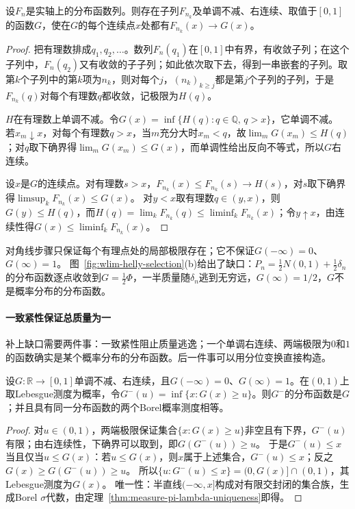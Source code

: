 \begin{lemma}
\label{lem:wlim-helly}
设$F_n$是实轴上的分布函数列。则存在子列$F_{n_k}$及单调不减、右连续、取值于$[0,1]$的函数$G$，使在$G$的每个连续点$x$处都有$F_{n_k}(x)\to G(x)$。
\end{lemma}

\begin{proof}
把有理数排成$q_1,q_2,\ldots$。数列$F_n(q_1)$在$[0,1]$中有界，有收敛子列；在这个子列中，$F_n(q_2)$又有收敛的子子列；如此依次取下去，得到一串嵌套的子列。取第$k$个子列中的第$k$项为$n_k$，则对每个$j$，$(n_k)_{k\geq j}$都是第$j$个子列的子列，于是$F_{n_k}(q)$对每个有理数$q$都收敛，记极限为$H(q)$。

$H$在有理数上单调不减。令$G(x)=\inf\{H(q):q\in\mathbb Q,\,q>x\}$，它单调不减。
若$x_m\downarrow x$，对每个有理数$q>x$，当$m$充分大时$x_m<q$，故$\lim_mG(x_m)\leq H(q)$；对$q$取下确界得$\lim_mG(x_m)\leq G(x)$，而单调性给出反向不等式，所以$G$右连续。

设$x$是$G$的连续点。对有理数$s>x$，$F_{n_k}(x)\leq F_{n_k}(s)\to H(s)$，对$s$取下确界得$\limsup_kF_{n_k}(x)\leq G(x)$。
对$y<x$取有理数$q\in(y,x)$，则$G(y)\leq H(q)$，而$H(q)=\lim_kF_{n_k}(q)\leq\liminf_kF_{n_k}(x)$；令$y\uparrow x$，由连续性得$G(x)\leq\liminf_kF_{n_k}(x)$。
\end{proof}

对角线步骤只保证每个有理点处的局部极限存在；它不保证$G(-\infty)=0$、$G(\infty)=1$。
图~\ref{fig:wlim-helly-selection}(b)给出了缺口：$P_n=\tfrac12N(0,1)+\tfrac12\delta_n$的分布函数逐点收敛到$G=\tfrac12\Phi$，一半质量随$\delta_n$逃到无穷远，$G(\infty)=1/2$，$G$不是概率分布的分布函数。

\paragraph{一致紧性保证总质量为一}
补上缺口需要两件事：一致紧性阻止质量逃逸；一个单调右连续、两端极限为$0$和$1$的函数确实是某个概率分布的分布函数。后一件事可以用分位变换直接构造。

\begin{lemma}[由分布函数构造分布]
\label{lem:wlim-quantile-construction}
设$G:\mathbb R\to[0,1]$单调不减、右连续，且$G(-\infty)=0$、$G(\infty)=1$。在$(0,1)$上取Lebesgue测度为概率，令$G^{-}(u)=\inf\{x:G(x)\geq u\}$。则$G^{-}$的分布函数是$G$；并且具有同一分布函数的两个Borel概率测度相等。
\end{lemma}

\begin{proof}
对$u\in(0,1)$，两端极限保证集合$\{x:G(x)\geq u\}$非空且有下界，$G^{-}(u)$有限；由右连续性，下确界可以取到，即$G(G^{-}(u))\geq u$。
于是$G^{-}(u)\leq x$当且仅当$u\leq G(x)$：若$u\leq G(x)$，则$x$属于上述集合，$G^{-}(u)\leq x$；反之$G(x)\geq G(G^{-}(u))\geq u$。
所以$\{u:G^{-}(u)\leq x\}=(0,G(x)]\cap(0,1)$，其Lebesgue测度为$G(x)$。
唯一性：半直线$(-\infty,x]$构成对有限交封闭的集合族，生成Borel $\sigma$代数，由定理~\ref{thm:measure-pi-lambda-uniqueness}即得。
\end{proof}

